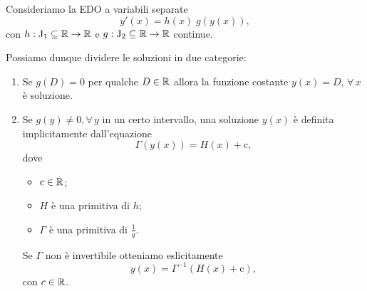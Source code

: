 \documentclass[../../analisi2]{subfiles}
\begin{document}
        \begin{teorema}
            Consideriamo la EDO a variabili separate
            \[
                y'(x) = h(x) \; g(y(x)),
            \]
            con \(h : \mathrm{J}_1 \subseteq \mathbb{R} \to \mathbb{R}\) e \(g : \mathrm{J}_2 \subseteq \mathbb{R} \to \mathbb{R}\) continue.

            Possiamo dunque dividere le soluzioni in due categorie:
            \begin{enumerate}
                \item Se \(g(D) = 0\) per qualche \(D \in \mathbb{R}\) allora la funzione costante \(y(x) = D, \, \forall \, x\) è soluzione.
                \item Se \(g(y) \neq 0, \forall \, y\) in un certo intervallo, una soluzione \(y(x)\) è definita implicitamente
                    dall'equazione
                    \[
                        \Gamma(y(x)) = H(x) + \mathrm{c},
                    \]
                    dove
                    \begin{itemize}
                        \item \(\mathrm{c} \in \mathbb{R}\);
                        \item \(H\) è una primitiva di \(h\);
                        \item \(\Gamma\) è una primitiva di \(\frac{1}{g}\).
                    \end{itemize}

                    Se \(\Gamma\) non è invertibile otteniamo eslicitamente
                    \[
                        y(x) = \Gamma^{-1}(H(x) + \mathrm{c}),
                    \]
                    con \(c \in \mathbb{R}\).
            \end{enumerate}
        \end{teorema}
        \newpage
\end{document}
